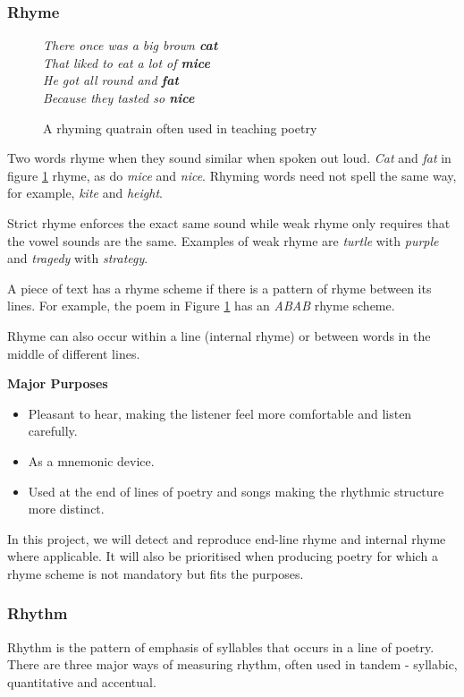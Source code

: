 \subsubsection{Rhyme}
\label{sec:rhyme}

\begin{figure}[h!]
\centering
\textit{
There once was a big brown \textbf{cat}\\
That liked to eat a lot of \textbf{mice}\\
He got all round and \textbf{fat}\\
Because they tasted so \textbf{nice}
}
\caption{A rhyming quatrain often used in teaching poetry}
\label{fig:rhyme}
\end{figure}
Two words rhyme when they sound similar when spoken out loud. \textit{Cat} and \textit{fat} in figure \ref{fig:rhyme} rhyme, as do \textit{mice} and \textit{nice}. Rhyming words need not spell the same way, for example, \textit{kite} and \textit{height}. 

Strict rhyme enforces the exact same sound while weak rhyme only requires that the vowel sounds are the same. Examples of weak rhyme are \textit{turtle} with \textit{purple} and \textit{tragedy} with \textit{strategy}. 

A piece of text has a rhyme scheme if there is a pattern of rhyme between its lines. For example, the poem in Figure \ref{fig:rhyme} has an \textit{ABAB} rhyme scheme.

Rhyme can also occur within a line (internal rhyme) or between words in the middle of different lines.

\textbf{Major Purposes} 
\begin{itemize}
\item{Pleasant to hear, making the listener feel more comfortable and listen carefully.} 
\item{As a mnemonic device.}
\item{Used at the end of lines of poetry and songs making the rhythmic structure more distinct.}
\end{itemize}

In this project, we will detect and reproduce end-line rhyme and internal rhyme where applicable. It will also be prioritised when producing poetry for which a rhyme scheme is not mandatory but fits the purposes.

\subsubsection{Rhythm}
\label{sec:rhythm}
Rhythm is the pattern of emphasis of syllables that occurs in a line of poetry. There are three major ways of measuring rhythm, often used in tandem - syllabic, quantitative and accentual.

